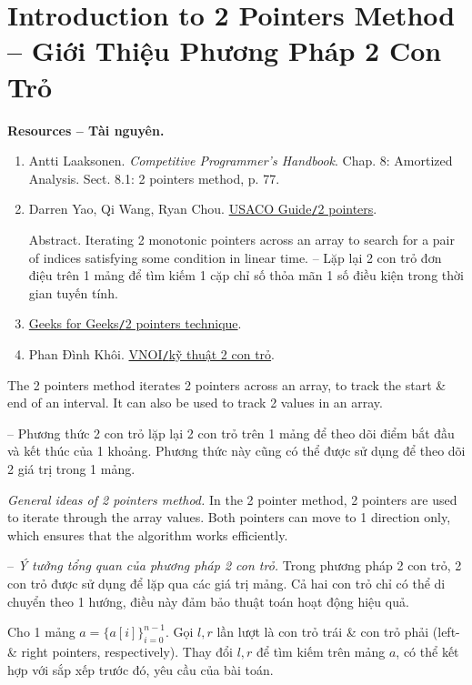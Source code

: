 \documentclass{article}
\begin{document}

\section{Introduction to 2 Pointers Method -- Giới Thiệu Phương Pháp 2 Con Trỏ}
\textbf{\textsf{Resources -- Tài nguyên.}}
\begin{enumerate}
    \item {\sc Antti Laaksonen}. {\it Competitive Programmer's Handbook}. Chap. 8: Amortized Analysis. Sect. 8.1: 2 pointers method, p. 77.

    \item {\sc Darren Yao, Qi Wang, Ryan Chou}. \href{https://usaco.guide/silver/two-pointers?lang=cpp}{USACO Guide{\tt/}2 pointers}.

    {\sf Abstract.} Iterating 2 monotonic pointers across an array to search for a pair of indices satisfying some condition in linear time. -- Lặp lại 2 con trỏ đơn điệu trên 1 mảng để tìm kiếm 1 cặp chỉ số thỏa mãn 1 số điều kiện trong thời gian tuyến tính.

    \item \href{https://www.geeksforgeeks.org/dsa/two-pointers-technique/}{Geeks for Geeks{\tt/}2 pointers technique}.

    \item {\sc Phan Đình Khôi}. \href{https://wiki.vnoi.info/algo/basic/two-pointers}{VNOI{\tt/}kỹ thuật 2 con trỏ}.
\end{enumerate}
The 2 pointers method iterates 2 pointers across an array, to track the start \& end of an interval. It can also be used to track 2 values in an array.

-- Phương thức 2 con trỏ lặp lại 2 con trỏ trên 1 mảng để theo dõi điểm bắt đầu và kết thúc của 1 khoảng. Phương thức này cũng có thể được sử dụng để theo dõi 2 giá trị trong 1 mảng.

{\it General ideas of 2 pointers method.} In the 2 pointer method, 2 pointers are used to iterate through the array values. Both pointers can move to 1 direction only, which ensures that the algorithm works efficiently.

-- {\it Ý tưởng tổng quan của phương pháp 2 con trỏ.} Trong phương pháp 2 con trỏ, 2 con trỏ được sử dụng để lặp qua các giá trị mảng. Cả hai con trỏ chỉ có thể di chuyển theo 1 hướng, điều này đảm bảo thuật toán hoạt động hiệu quả.

Cho 1 mảng $a = \{a[i]\}_{i=0}^{n-1}$. Gọi $l,r$ lần lượt là con trỏ trái \& con trỏ phải (left- \& right pointers, respectively). Thay đổi $l,r$ để tìm kiếm trên mảng $a$, có thể kết hợp với sắp xếp trước đó, yêu cầu của bài toán.
\end{document}
